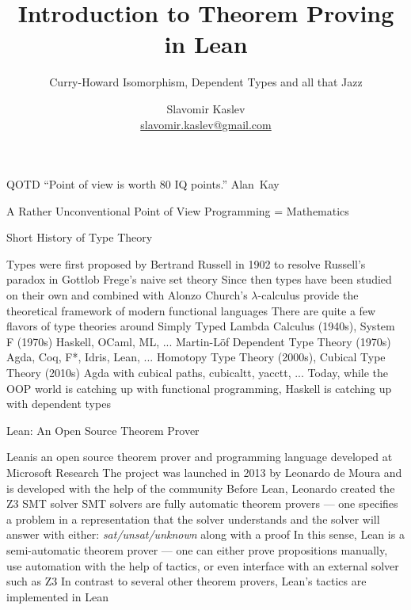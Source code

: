 \documentclass[pdf]{beamer}
\title{Introduction to Theorem Proving in Lean}
\subtitle{Curry-Howard Isomorphism, Dependent Types and all that Jazz}
\author{Slavomir Kaslev \\
  \href{mailto:slavomir.kaslev@gmail.com}{slavomir.kaslev@gmail.com}}
\begin{document}
\begin{frame}
  \titlepage
\end{frame}

\begin{frame}{QOTD}
  ``Point of view is worth 80 IQ points.'' \mbox{Alan Kay}
\end{frame}

\begin{frame}{A Rather Unconventional Point of View}
  \centering \Large
  Programming\footnotemark[1]\hspace*{1pt} = Mathematics
\end{frame}

\begin{frame}{Short History of Type Theory}
  \begin{outline}
    \1 Types were first proposed by Bertrand Russell in 1902 to resolve Russell's paradox in Gottlob Frege's naive set theory
    \1 Since then types have been studied on their own and combined with Alonzo Church's $\lambda$-calculus
    provide the theoretical framework of modern functional languages
    \1 There are quite a few flavors of type theories around
    \2 Simply Typed Lambda Calculus (1940s), System F (1970s)
    \3 Haskell, OCaml, ML, ...
    \2 Martin-Löf Dependent Type Theory (1970s)
    \3 Agda, Coq, F*, Idris, Lean, ...
    \2 Homotopy Type Theory (2000s), Cubical Type Theory (2010s)
    \3 Agda with cubical paths, cubicaltt, yacctt, ...
    \1 Today, while the OOP world is catching up with functional programming, Haskell is catching up with dependent types
  \end{outline}
\end{frame}

\begin{frame}{Lean: An Open Source Theorem Prover}
  \begin{outline}
    \1 Lean\footnotemark[2] is an open source theorem prover and programming language developed at Microsoft Research
    \1 The project was launched in 2013 by Leonardo de Moura and is developed with the help of the community
    \2 Before Lean, Leonardo created the Z3\footnotemark[3]\hspace*{1pt} SMT solver
    \2 SMT solvers are fully automatic theorem provers --- one specifies a problem in a representation that the solver understands and the solver will answer with either: {\em sat/unsat/unknown} along with a proof
    \2 In this sense, Lean is a semi-automatic theorem prover --- one can either prove propositions manually, use automation with the help of tactics, or even interface with an external solver such as Z3
    \2 In contrast to several other theorem provers, Lean's tactics are implemented in Lean
  \end{outline}
\end{frame}
\end{document}
